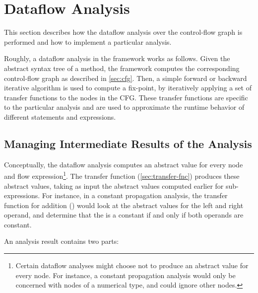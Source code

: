 \section{Dataflow Analysis}

This section describes how the dataflow analysis over the control-flow
graph is performed and how to implement a particular analysis.

Roughly, a dataflow analysis in the framework works as follows. Given
the abstract syntax tree of a method, the framework computes the
corresponding control-flow graph as described in
\autoref{sec:cfg}. Then, a simple forward or backward iterative
algorithm is used to compute a fix-point, by iteratively applying a
set of transfer functions to the nodes in the CFG\@.  These transfer
functions are specific to the particular analysis and are used to
approximate the runtime behavior of different statements and expressions.


\subsection{Managing Intermediate Results of the Analysis}
\label{sec:node-mapping}
\label{sec:store-management}


Conceptually, the dataflow analysis computes an abstract value for
every node and flow expression\footnote{Certain dataflow analyses
  might choose not to produce an abstract value for every node.  For
  instance, a constant propagation analysis would only be concerned
  with nodes of a numerical type, and could ignore other nodes.}.  The
transfer function (\autoref{sec:transfer-fnc}) produces these abstract
values, taking as input the abstract values computed earlier for
sub-expressions.  For instance, in a constant propagation analysis,
the transfer function for addition (\code{+}) would look at the
abstract values for the left and right operand, and determine that the
 is a constant if and only if both operands are
constant.

An analysis result contains two parts:


